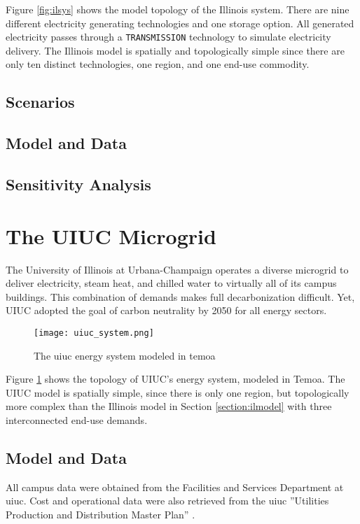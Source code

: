 Figure \ref{fig:ilsys} shows the model topology of the Illinois system. There
are nine different electricity generating technologies and one storage option.
All generated electricity passes through a \texttt{TRANSMISSION} technology
to simulate electricity delivery. The Illinois model is spatially and topologically
simple since there are only ten distinct technologies, one region, and one
end-use commodity.

\subsection{Scenarios}

\subsection{Model and Data}

\subsection{Sensitivity Analysis}

\section{The UIUC Microgrid}

The University of Illinois at Urbana-Champaign operates a diverse microgrid to
deliver electricity, steam heat, and chilled water to virtually all of its
campus buildings. This combination of demands makes full decarbonization difficult.
Yet, UIUC adopted the goal of carbon neutrality by 2050 for all energy sectors.

\begin{figure}[H]
  \texttt{[image: uiuc\_system.png]}
  \caption{The \gls{uiuc} energy system modeled in \gls{temoa}}
  \label{fig:uiucsys}
\end{figure}

Figure \ref{fig:uiucsys} shows the topology of UIUC’s energy system, modeled in Temoa.
The UIUC model is spatially simple, since there is only one region, but topologically
more complex than the Illinois model in Section \ref{section:ilmodel} with
three interconnected end-use demands.

\subsection{Model and Data}
All campus data were obtained from the Facilities and Services Department at \gls{uiuc}.
Cost and operational data were also retrieved from the \gls{uiuc} ''Utilities
Production and Distribution Master Plan'' \cite{affiliated_engineers_inc_utilities_2015}.


